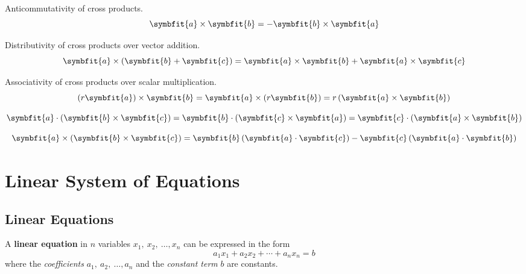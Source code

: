 \documentclass{article}
\begin{document}
\begin{theorem}
    Anticommutativity of cross products.
    \begin{equation*}
        \symbfit{a}\times \symbfit{b} = -\symbfit{b}\times \symbfit{a}
    \end{equation*}
\end{theorem}
\begin{theorem}
    Distributivity of cross products over vector addition.
    \begin{equation*}
        \symbfit{a}\times\left( \symbfit{b}+\symbfit{c} \right) = \symbfit{a}\times\symbfit{b} + \symbfit{a}\times\symbfit{c}
    \end{equation*}
\end{theorem}
\begin{theorem}
    Associativity of cross products over scalar multiplication.
    \begin{equation*}
        \left( r \symbfit{a}\right)\times\symbfit{b} = \symbfit{a}\times\left( r \symbfit{b} \right) = r\left(\symbfit{a}\times\symbfit{b}\right)
    \end{equation*}
\end{theorem}
\begin{theorem}
    \begin{equation*}
        \symbfit{a} \cdot \left(\symbfit{b}\times\symbfit{c}\right) = \symbfit{b} \cdot \left(\symbfit{c}\times\symbfit{a}\right) = \symbfit{c} \cdot \left(\symbfit{a}\times\symbfit{b}\right)
    \end{equation*}
\end{theorem}
\begin{theorem}
    \begin{equation*}
        \symbfit{a} \times \left(\symbfit{b}\times\symbfit{c}\right) = \symbfit{b} \left(\symbfit{a}\cdot\symbfit{c}\right) - \symbfit{c}\left(\symbfit{a}\cdot\symbfit{b}\right)
    \end{equation*}
\end{theorem}
\newpage
\section{Linear System of Equations}
\subsection{Linear Equations}
\begin{definition}
    A \textbf{linear equation} in \(n\) variables
    \(x_1,\: x_2,\: \dots, x_n\) can be expressed in the form
    \begin{equation*}
        a_{1}x_1 + a_{2}x_2 + \cdots + a_{n}x_n = b
    \end{equation*}
    where the \textit{coefficients} \(a_1,\: a_2,\: \dots, a_n\) and the
    \textit{constant term} \(b\) are constants.
\end{definition}
\end{document}
